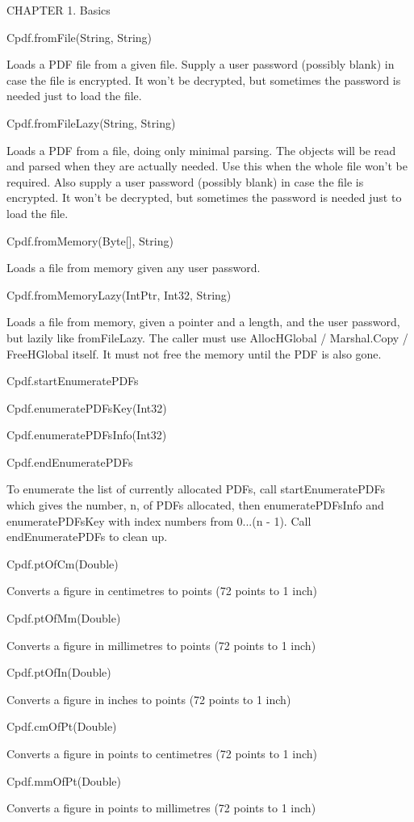 CHAPTER 1. Basics

Cpdf.fromFile(String, String)

Loads a PDF file from a given file. Supply a user password (possibly blank) in
case the file is encrypted. It won't be decrypted, but sometimes the password
is needed just to load the file.

Cpdf.fromFileLazy(String, String)

Loads a PDF from a file, doing only minimal parsing. The objects will be read
and parsed when they are actually needed. Use this when the whole file won't be
required. Also supply a user password (possibly blank) in case the file is
encrypted. It won't be decrypted, but sometimes the password is needed just to
load the file.

Cpdf.fromMemory(Byte[], String)

Loads a file from memory given any user password.

Cpdf.fromMemoryLazy(IntPtr, Int32, String)

Loads a file from memory, given a pointer and a length, and the user password,
but lazily like fromFileLazy. The caller must use AllocHGlobal / Marshal.Copy /
FreeHGlobal itself. It must not free the memory until the PDF is also gone.

Cpdf.startEnumeratePDFs

Cpdf.enumeratePDFsKey(Int32)

Cpdf.enumeratePDFsInfo(Int32)

Cpdf.endEnumeratePDFs

To enumerate the list of currently allocated PDFs, call startEnumeratePDFs
which gives the number, n, of PDFs allocated, then enumeratePDFsInfo and
enumeratePDFsKey with index numbers from 0...(n - 1). Call endEnumeratePDFs to
clean up.

Cpdf.ptOfCm(Double)

Converts a figure in centimetres to points (72 points to 1 inch)

Cpdf.ptOfMm(Double)

Converts a figure in millimetres to points (72 points to 1 inch)

Cpdf.ptOfIn(Double)

Converts a figure in inches to points (72 points to 1 inch)

Cpdf.cmOfPt(Double)

Converts a figure in points to centimetres (72 points to 1 inch)

Cpdf.mmOfPt(Double)

Converts a figure in points to millimetres (72 points to 1 inch)

